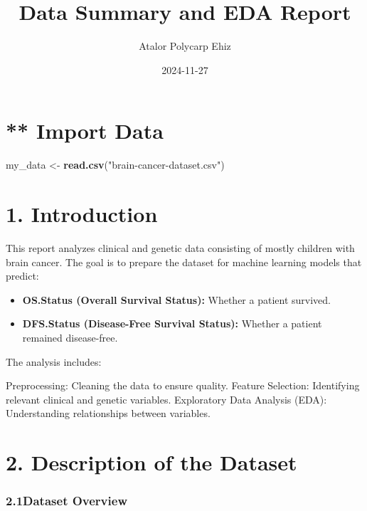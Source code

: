 \documentclass[
]{article}
\title{Data Summary and EDA Report}
\author{Atalor Polycarp Ehiz}
\date{2024-11-27}
\newenvironment{Shaded}{\begin{snugshade}}{\end{snugshade}}
\newcommand{\FunctionTok}[1]{\textcolor[rgb]{0.13,0.29,0.53}{\textbf{#1}}}
\newcommand{\NormalTok}[1]{#1}
\newcommand{\OtherTok}[1]{\textcolor[rgb]{0.56,0.35,0.01}{#1}}
\newcommand{\StringTok}[1]{\textcolor[rgb]{0.31,0.60,0.02}{#1}}
\begin{document}
\maketitle

\section{** Import Data}\label{import-data}

\begin{Shaded}
\begin{Highlighting}[]
\NormalTok{     my\_data }\OtherTok{\textless{}{-}} \FunctionTok{read.csv}\NormalTok{(}\StringTok{"brain{-}cancer{-}dataset.csv"}\NormalTok{)}
\end{Highlighting}
\end{Shaded}

\section{\texorpdfstring{\textbf{1.
Introduction}}{1. Introduction}}\label{introduction}

This report analyzes clinical and genetic data consisting of mostly
children with brain cancer. The goal is to prepare the dataset for
machine learning models that predict:

\begin{itemize}
\item
  \textbf{OS.Status (Overall Survival Status):} Whether a patient
  survived.
\item
  \textbf{DFS.Status (Disease-Free Survival Status):} Whether a patient
  remained disease-free.
\end{itemize}

The analysis includes:

Preprocessing: Cleaning the data to ensure quality. Feature Selection:
Identifying relevant clinical and genetic variables. Exploratory Data
Analysis (EDA): Understanding relationships between variables.

\section{\texorpdfstring{\textbf{2. Description of the
Dataset}}{2. Description of the Dataset}}\label{description-of-the-dataset}

\subsubsection{\texorpdfstring{2.1\textbf{Dataset
Overview}}{2.1Dataset Overview}}\label{dataset-overview}
\end{document}
